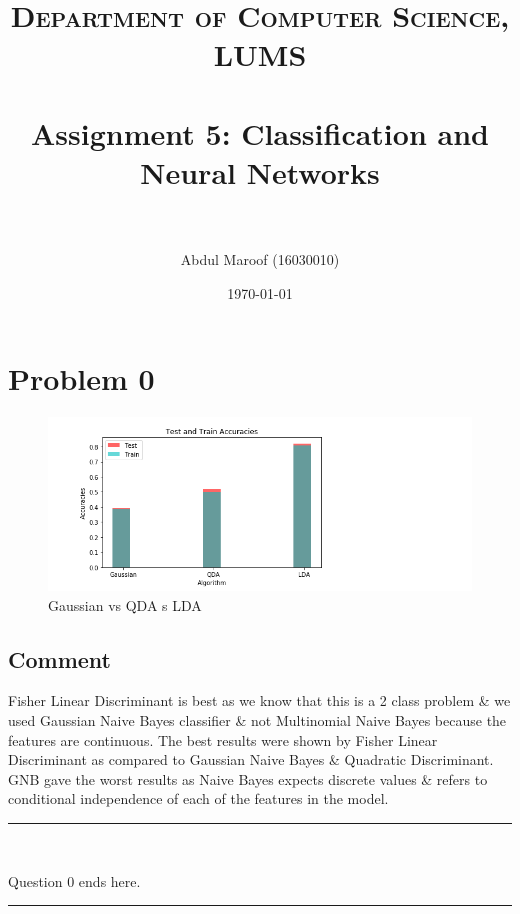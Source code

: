 \documentclass[paper=a4, fontsize=11pt]{scrartcl} %
\title{	
\normalfont \normalsize 
\textsc{Department of Computer Science, LUMS} \\ [25pt] %
\horrule{0.5pt} \\[0.4cm] %
\huge Assignment 5: Classification and Neural Networks \\ %
\horrule{2pt} \\[0.5cm] %
}
\author{Abdul Maroof (16030010)} %
\date{\normalsize\today} %
\numberwithin{equation}{section} %
\numberwithin{figure}{section} %
\numberwithin{table}{section} %
\newcommand{\horrule}[1]{\rule{\linewidth}{#1}} %
\begin{document}
\maketitle %

\section{Problem 0}

\begin{figure}[h]
\begin{center}
\includegraphics[width=1.4\textwidth]{Question0.png}
\end{center}
\caption{Gaussian vs QDA s LDA}
\label{fig:Question0}
\end{figure}

\subsection{Comment} 
Fisher Linear Discriminant is best as we know that this is a 2 class problem \& we used Gaussian Naive Bayes classifier \& not Multinomial Naive Bayes because the features are continuous.
The best results were shown by Fisher Linear Discriminant as compared to Gaussian Naive Bayes \& Quadratic Discriminant. GNB gave the worst results as Naive Bayes expects discrete values \&  refers to conditional independence of each of the features in the model.

\horrule{0.5pt} \\
\begin{center}
Question 0 ends here.
\horrule{2pt} \\
\end{center}

\pagebreak
\end{document}
